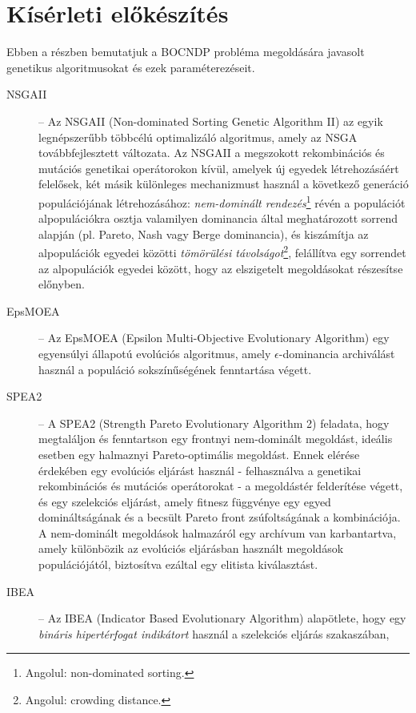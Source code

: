 \section{Kísérleti előkészítés}

Ebben a részben bemutatjuk a BOCNDP probléma megoldására javasolt genetikus algoritmusokat
és ezek paraméterezéseit.

\begin{description}
      \item[NSGAII] -- Az NSGAII (Non-dominated Sorting Genetic Algorithm II) \cite{ventresca2018bi} az egyik legnépszerűbb többcélú optimalizáló algoritmus,
            amely az NSGA továbbfejlesztett változata. Az NSGAII a megszokott rekombinációs és mutációs genetikai operátorokon kívül,
            amelyek új egyedek létrehozásáért felelősek, két másik különleges mechanizmust használ a következő generáció populációjának létrehozásához:
            \textit{nem-dominált rendezés}\footnote{ Angolul: non-dominated sorting. } révén a populációt alpopulációkra
            osztja valamilyen dominancia által meghatározott sorrend alapján (pl. Pareto, Nash vagy Berge dominancia),
            és kiszámítja az alpopulációk egyedei közötti \textit{tömörülési távolságot}\footnote{ Angolul: crowding distance. },
            felállítva egy sorrendet az alpopulációk egyedei között, hogy az elszigetelt megoldásokat részesítse előnyben.
      \item[EpsMOEA] -- Az EpsMOEA (Epsilon Multi-Objective Evolutionary Algorithm) \cite{ventresca2018bi} egy egyensúlyi állapotú evolúciós algoritmus,
            amely $\epsilon$-dominancia archiválást használ a populáció sokszínűségének fenntartása végett.
      \item[SPEA2] -- A SPEA2 (Strength Pareto Evolutionary Algorithm 2) \cite{brownlee2011clever} feladata, hogy megtaláljon és fenntartson egy frontnyi nem-dominált megoldást,
            ideális esetben egy halmaznyi Pareto-optimális megoldást. Ennek elérése érdekében egy evolúciós eljárást használ
            - felhasználva a genetikai rekombinációs és mutációs operátorokat - a megoldástér felderítése végett,
            és egy szelekciós eljárást, amely fitnesz függvénye egy egyed domináltságának és a becsült Pareto front zsúfoltságának a kombinációja.
            A nem-dominált megoldások halmazáról egy archívum van karbantartva, amely különbözik az evolúciós eljárásban használt megoldások populációjától,
            biztosítva ezáltal egy elitista kiválasztást.
      \item[IBEA] -- Az IBEA (Indicator Based Evolutionary Algorithm) \cite{li2017modified} alapötlete, hogy egy \textit{bináris hipertérfogat indikátort} használ a szelekciós eljárás szakaszában,

\end{description}
